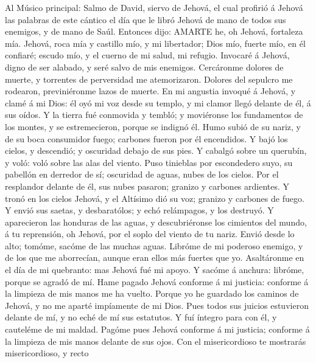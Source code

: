  Al Músico principal: Salmo de David, siervo de Jehová, el
cual profirió á Jehová las palabras de este cántico el día que le libró
Jehová de mano de todos sus enemigos, y de mano de Saúl. Entonces dijo:
AMARTE he, oh Jehová, fortaleza mía.  Jehová, roca mía y
castillo mío, y mi libertador; Dios mío, fuerte mío, en él confiaré;
escudo mío, y el cuerno de mi salud, mi refugio.  Invocaré á
Jehová, digno de ser alabado, y seré salvo de mis enemigos. 
Cercáronme dolores de muerte, y torrentes de perversidad me
atemorizaron.  Dolores del sepulcro me rodearon,
previniéronme lazos de muerte.  En mi angustia invoqué á
Jehová, y clamé á mi Dios: él oyó mi voz desde su templo, y mi clamor
llegó delante de él, á sus oídos.  Y la tierra fué conmovida
y tembló; y moviéronse los fundamentos de los montes, y se
estremecieron, porque se indignó él.  Humo subió de su
nariz, y de su boca consumidor fuego; carbones fueron por él encendidos.
 Y bajó los cielos, y descendió; y oscuridad debajo de sus
pies.  Y cabalgó sobre un querubín, y voló: voló sobre las
alas del viento.  Puso tinieblas por escondedero suyo, su
pabellón en derredor de sí; oscuridad de aguas, nubes de los cielos.
 Por el resplandor delante de él, sus nubes pasaron;
granizo y carbones ardientes.  Y tronó en los cielos
Jehová, y el Altísimo dió su voz; granizo y carbones de fuego.
 Y envió sus saetas, y desbaratólos; y echó relámpagos, y
los destruyó.  Y aparecieron las honduras de las aguas, y
descubriéronse los cimientos del mundo, á tu reprensión, oh Jehová, por
el soplo del viento de tu nariz.  Envió desde lo alto;
tomóme, sacóme de las muchas aguas.  Libróme de mi poderoso
enemigo, y de los que me aborrecían, aunque eran ellos más fuertes que
yo.  Asaltáronme en el día de mi quebranto: mas Jehová fué
mi apoyo.  Y sacóme á anchura: libróme, porque se agradó de
mí.  Hame pagado Jehová conforme á mi justicia: conforme á
la limpieza de mis manos me ha vuelto.  Porque yo he
guardado los caminos de Jehová, y no me aparté impíamente de mi Dios.
 Pues todos sus juicios estuvieron delante de mí, y no eché
de mí sus estatutos.  Y fuí íntegro para con él, y
cauteléme de mi maldad.  Pagóme pues Jehová conforme á mi
justicia; conforme á la limpieza de mis manos delante de sus ojos.
 Con el misericordioso te mostrarás misericordioso, y recto
